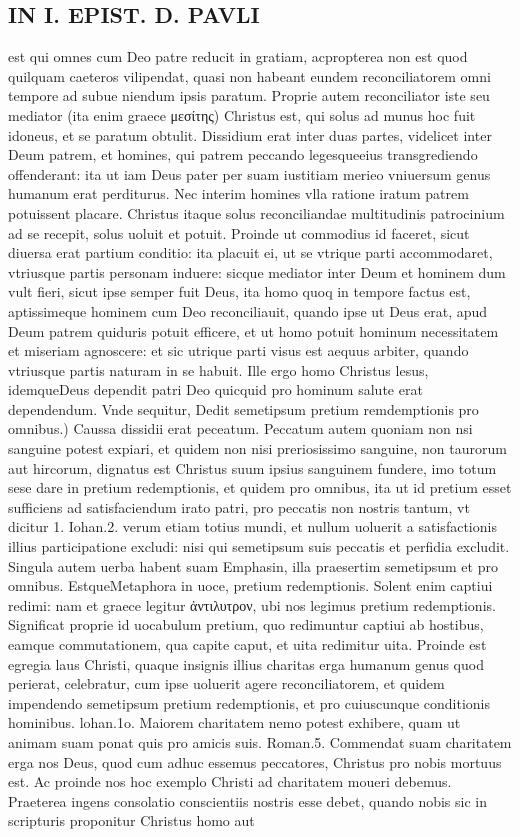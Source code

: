 \documentclass{article}
\begin{document}
\begin{pages}
\section*{IN I. EPIST. D. PAVLI }
\marginpar{[ p.68 ]}\pstart est qui omnes cum Deo patre reducit in gratiam, acpropterea non est quod quilquam caeteros vilipendat, quasi non habeant eundem reconciliatorem omni tempore ad subue niendum ipsis paratum. Proprie autem reconciliator iste seu mediator (ita enim graece μεσίτης) Christus est, qui solus ad munus hoc fuit idoneus, et se paratum obtulit. Dissidium erat inter duas partes, videlicet inter Deum patrem, et homines, qui patrem peccando legesqueeius transgrediendo offenderant: ita ut iam Deus pater per suam iustitiam merieo vniuersum genus humanum erat perditurus. Nec interim homines vlla ratione iratum patrem potuissent placare. Christus itaque  solus reconciliandae multitudinis patrocinium ad se recepit, solus uoluit et potuit. Proinde ut commodius id faceret, sicut diuersa erat partium conditio: ita placuit ei, ut se vtrique  parti accommodaret, vtriusque  partis personam induere: sicque  mediator inter Deum et hominem dum vult fieri, sicut ipse semper fuit Deus, ita homo quoq in tempore factus est, aptissimeque  hominem cum Deo reconciliauit, quando ipse ut Deus erat, apud Deum patrem quiduris potuit efficere, et ut homo potuit hominum necessitatem et miseriam agnoscere: et sic utrique  parti visus est aequus arbiter, quando vtriusque  partis naturam in se habuit. Ille ergo homo Christus lesus, idemqueDeus dependit patri Deo quicquid pro hominum salute erat dependendum. Vnde sequitur,  \pend\pstart Dedit semetipsum pretium remdemptionis pro omnibus.) Caussa dissidii erat peceatum. Peccatum autem quoniam non nsi sanguine potest expiari, et quidem non nisi preriosissimo sanguine, non taurorum aut hircorum, dignatus est Christus suum ipsius sanguinem fundere, imo totum sese dare in pretium redemptionis, et quidem pro omnibus, ita ut id pretium esset sufficiens ad satisfaciendum irato patri, pro peccatis non nostris tantum, vt dicitur 1. Iohan.2. verum etiam totius mundi, et nullum uoluerit a satisfactionis illius participatione excludi: nisi qui semetipsum suis peccatis et perfidia excludit. Singula autem uerba habent suam Emphasin, illa praesertim semetipsum et pro omnibus. EstqueMetaphora in uoce, pretium redemptionis. Solent enim captiui redimi: nam et graece legitur ἀντιλυτρον, ubi nos legimus pretium redemptionis. Significat proprie id uocabulum pretium, quo redimuntur captiui ab hostibus, eamque  commutationem, qua capite caput, et uita redimitur uita. Proinde est egregia laus Christi, quaque  insignis illius charitas erga humanum genus quod perierat, celebratur, cum ipse uoluerit agere reconciliatorem, et quidem impendendo semetipsum pretium redemptionis, et pro cuiuscunque  conditionis hominibus. lohan.1o. Maiorem charitatem nemo potest exhibere, quam ut animam suam ponat quis pro amicis suis. Roman.5. Commendat suam charitatem erga nos Deus, quod cum adhuc essemus peccatores, Christus pro nobis mortuus est. Ac proinde nos hoc exemplo Christi ad charitatem moueri debemus. Praeterea ingens consolatio conscientiis nostris esse debet, quando nobis sic in scripturis proponitur Christus homo aut 
\end{pages}
\end{document}
